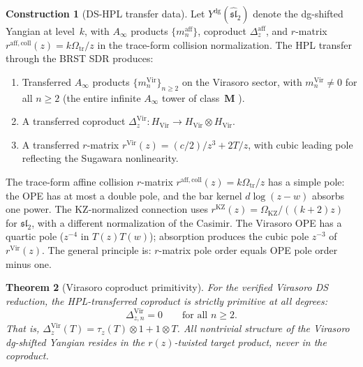 \documentclass[11pt]{article}
\theoremstyle{plain}
\newtheorem{theorem}{Theorem}[section]
\theoremstyle{definition}
\newtheorem{construction}[theorem]{Construction}
\theoremstyle{remark}
\begin{document}
\begin{construction}[DS-HPL transfer data]\label{thm:ds-hpl-standalone}
Let $Y^{\mathrm{dg}}(\widehat{\mathfrak{sl}}_2)$ denote the
dg-shifted Yangian at level~$k$, with $A_\infty$ products
$\{m_n^{\mathrm{aff}}\}$, coproduct
$\Delta_z^{\mathrm{aff}}$, and $r$-matrix
$r^{\mathrm{aff,coll}}(z)=k\Omega_{\mathrm{tr}}/z$ in the trace-form
collision normalization. The HPL transfer through the
BRST SDR produces:
\begin{enumerate}[label=\textup{(\roman*)}]
\item Transferred $A_\infty$ products
 $\{m_n^{\mathrm{Vir}}\}_{n \geq 2}$ on the Virasoro sector,
 with $m_n^{\mathrm{Vir}} \neq 0$ for all $n \geq 2$
 \textup{(}the entire infinite $A_\infty$ tower of class~$\mathbf{M}$%
 \textup{)}.
\item A transferred coproduct
 $\Delta_z^{\mathrm{Vir}} \colon H_{\mathrm{Vir}} \to
 H_{\mathrm{Vir}} \otimes H_{\mathrm{Vir}}$.
\item A transferred $r$-matrix
 $r^{\mathrm{Vir}}(z) = (c/2)/z^3 + 2T/z$,
 with cubic leading pole reflecting the Sugawara nonlinearity.
\end{enumerate}
\end{construction}

The trace-form affine collision $r$-matrix
$r^{\mathrm{aff,coll}}(z)=k\Omega_{\mathrm{tr}}/z$ has a simple
pole: the OPE has at most a double pole, and the bar kernel
$d\!\log(z-w)$ absorbs one power. The KZ-normalized connection uses
$r^{\mathrm{KZ}}(z)=\Omega_{\mathrm{KZ}}/((k+2)z)$ for
$\mathfrak{sl}_2$, with a different normalization of the Casimir.
The Virasoro OPE has a quartic pole ($z^{-4}$ in $T(z)T(w)$);
absorption produces the cubic pole $z^{-3}$ of
$r^{\mathrm{Vir}}(z)$. The general principle is: $r$-matrix pole
order equals OPE pole order minus one.

\begin{theorem}[Virasoro coproduct primitivity]
\label{thm:grav-primitivity-standalone}
For the verified Virasoro DS reduction, the HPL-transferred
coproduct is strictly primitive at all degrees:
\begin{equation}\label{eq:grav-prim}
\Delta_{z,n}^{\mathrm{Vir}} = 0
\qquad \text{for all } n \geq 2.
\end{equation}
That is, $\Delta_z^{\mathrm{Vir}}(T) = \tau_z(T) \otimes 1
+ 1 \otimes T$. All nontrivial structure of the Virasoro
dg-shifted Yangian resides in the $r(z)$-twisted target product,
never in the coproduct.
\end{theorem}
\end{document}
